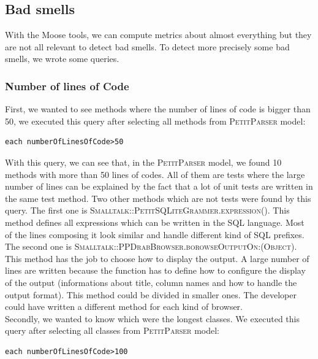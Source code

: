 \subsection{Bad smells}
With the Moose tools, we can compute metrics about almost everything but they are not all relevant to detect bad smells.  To detect more precisely some bad smells, we wrote some queries.
\subsubsection{Number of lines of Code}
First, we wanted to see methods where the number of lines of code is bigger than 50, we executed this query after selecting all methods from \textsc{PetitParser} model:
\begin{lstlisting}
each numberOfLinesOfCode>50
\end{lstlisting}
With this query, we can see that, in the \textsc{PetitParser} model, we found 10 methods with more than 50 lines of codes. All of them are tests where the large number of lines can be explained by the fact that a lot of unit tests are written in the same test method. Two other methods which are not tests were found by this query. The first one is \textsc{Smalltalk::PetitSQLiteGrammer.expression()}. This method defines all expressions which can be written in the SQL language. Most of the lines composing it look similar and handle different kind of SQL prefixes. The second one is \textsc{Smalltalk::PPDrabBrowser.borowseOutputOn:(Object)}. This method has the job to choose how to display the output. A large number of lines are written because the function has to define how to configure the display of the output (informations about title, column names and how to handle the output format). This method could be divided in smaller ones. The developer could have written a different method for each kind of browser. \\
Secondly, we wanted to know which were the longest classes. We executed this query after selecting all classes from \textsc{PetitParser} model:
\begin{lstlisting}
each numberOfLinesOfCode>100
\end{lstlisting}
